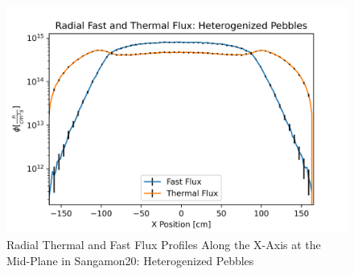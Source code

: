 \begin{figure}[H]
\centering

\includegraphics[width=0.95\linewidth]{figures/fast_therm_flux_het.png}

\caption{Radial Thermal and Fast Flux Profiles Along the X-Axis at the Mid-Plane in Sangamon20: Heterogenized Pebbles}
\label{fig:het-det-xy}
\end{figure}